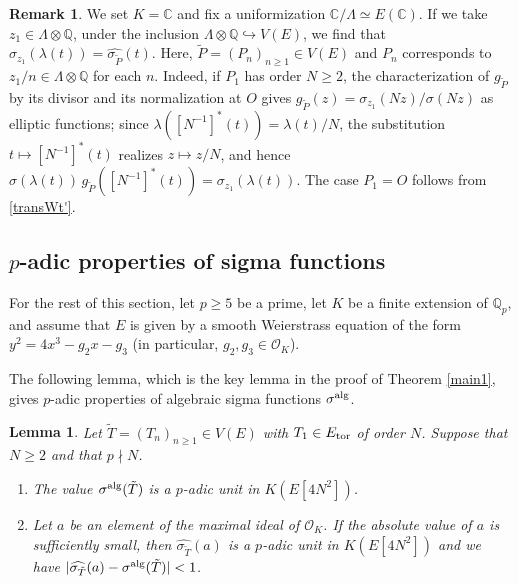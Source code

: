 \documentclass[11pt]{amsart}
\newtheorem{lem}[thm]{Lemma}
\theoremstyle{definition}
\newtheorem{rmk}[thm]{Remark}
\newcommand{\Q}{\mathbb{Q}}
\begin{document}
\begin{rmk}\label{ASSoverC}
We set $K=\mathbb{C}$ and fix a uniformization
$\mathbb{C}/\Lambda \simeq E(\mathbb{C})$. If we take
$z_1 \in \Lambda \otimes \mathbb{Q}$, under the inclusion
$\Lambda \otimes \mathbb{Q} \hookrightarrow V(E)$, we find that
$\sigma_{z_1}(\lambda(t))=\widehat{\sigma_{\tilde{P}}}(t)$. Here,
$\tilde{P}=(P_n)_{n \geq 1} \in V(E)$ and $P_n$ corresponds to
$z_1/n \in \Lambda \otimes \mathbb{Q}$ for each $n$.
Indeed, if $P_1$ has order $N \geq 2$, the characterization of
$g_{\tilde{P}}$ by its divisor and its normalization at $O$ gives
$g_{\tilde{P}}(z)=\sigma_{z_1}(Nz)/\sigma(Nz)$ as elliptic functions;
since $\lambda([N^{-1}]^{\ast}(t))=\lambda(t)/N$, the substitution
$t \mapsto [N^{-1}]^{\ast}(t)$ realizes $z \mapsto z/N$, and hence
$\sigma(\lambda(t))\,g_{\tilde{P}}([N^{-1}]^{\ast}(t))
=\sigma_{z_1}(\lambda(t))$.
The case $P_1=O$ follows from \eqref{transWt'}.
\end{rmk}


\subsection{$p$-adic properties of sigma functions}

For the rest of this section, let $p \geq  5$ be a prime, let $K$ be a finite extension of $\Q_p$, and
assume that $E$ is given by a smooth Weierstrass equation of the form $y^2 = 4x^3-g_2x-g_3$
(in particular, $g_2, g_3 \in \mathcal{O}_K$).

The following lemma, which is the key lemma in the proof of Theorem \ref{main1}, gives $p$-adic properties of algebraic sigma functions $\sigma^{\rm alg}$.

\begin{lem}\label{keylem}
Let $\tilde{T}=(T_n)_{n \geq 1} \in V(E)$ with $T_1 \in E_{\rm tor}$ of order $N$. Suppose that $N \geq 2$ and that $p \nmid N$.
\begin{enumerate}
\item %
The value $\sigma^{\rm alg}(\tilde{T})$ is a $p$-adic unit in $K(E[4N^2])$.
\item Let $a$ be an element of the maximal ideal of $\mathcal{O}_K$. If the absolute value of $a$ is sufficiently small, then $\widehat{\sigma_{\tilde{T}}}(a)$ is a $p$-adic unit in $K(E[4N^2])$ and we have $|\widehat{\sigma_{\tilde{T}}}(a)-\sigma^{\rm alg}(\tilde{T})|<1$.
\end{enumerate}
\end{lem}
\end{document}

